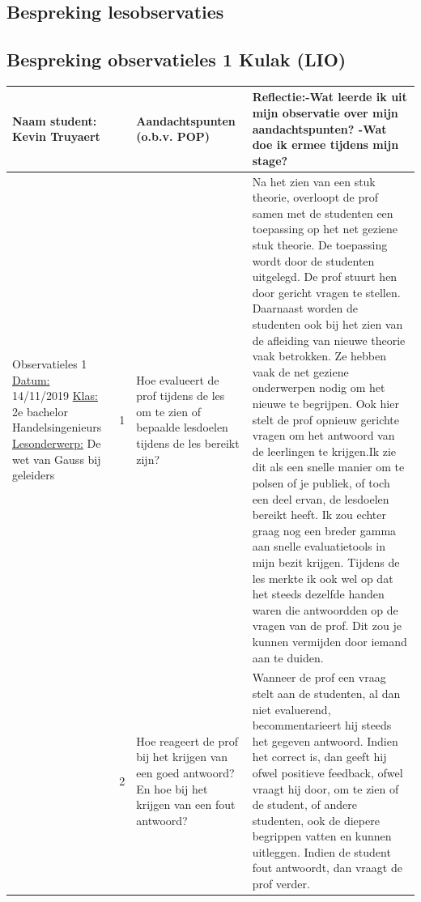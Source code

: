 \documentclass[a4paper,12pt,twoside]{article}%
\begin{document}
	
	\begin{landscape}
		
		\section{Bespreking lesobservaties}
		
		\subsection{Bespreking observatieles 1 Kulak  (LIO)}
		\begin{tabularx}{1.56\textwidth}{|Q{0.25\textwidth}|Q{0.1\textwidth}|Q{0.25\textwidth}|Q{0.85\textwidth}|}\hline
			\textbf{Naam student: Kevin Truyaert} & & Aandachtspunten (o.b.v. POP) & Reflectie:\newline -Wat leerde ik uit mijn observatie over mijn aandachtspunten? \newline -Wat doe ik ermee tijdens mijn stage?\\\hline
			Observatieles 1 \newline \underline{Datum:} 14/11/2019 \underline{Klas:} 2e bachelor Handelsingenieurs \newline \underline{Lesonderwerp:} De wet van Gauss bij geleiders & 1 & Hoe evalueert de prof tijdens de les om te zien of bepaalde lesdoelen tijdens de les bereikt zijn? & Na het zien van een stuk theorie, overloopt de prof samen met de studenten een toepassing op het net geziene stuk theorie. De toepassing wordt door de studenten uitgelegd. De prof stuurt hen door gericht vragen te stellen.  Daarnaast worden de studenten ook bij het zien van de afleiding van nieuwe theorie vaak betrokken. Ze hebben vaak de net geziene onderwerpen nodig om het nieuwe te begrijpen. Ook hier stelt de prof opnieuw gerichte vragen om het antwoord van de leerlingen te krijgen.\newline Ik zie dit als een snelle manier om te polsen of je publiek, of toch een deel ervan, de lesdoelen bereikt heeft. Ik zou echter graag nog een breder gamma aan snelle evaluatietools in mijn bezit krijgen. Tijdens de les merkte ik ook wel op dat het steeds dezelfde handen waren die antwoordden op de vragen van de prof. Dit zou je kunnen vermijden door iemand aan te duiden.  \\
			& 2 & Hoe reageert de prof bij het krijgen van een goed antwoord? En hoe bij het krijgen van een fout antwoord? & Wanneer de prof een vraag stelt aan de studenten, al dan niet evaluerend, becommentarieert hij steeds het gegeven antwoord. Indien het correct is, dan geeft hij ofwel positieve feedback, ofwel vraagt hij door, om te zien of de student, of andere studenten, ook de diepere begrippen vatten en kunnen uitleggen. Indien de student fout antwoordt, dan vraagt de prof verder. 
		\end{tabularx}
		

\end{landscape}
\end{document}
